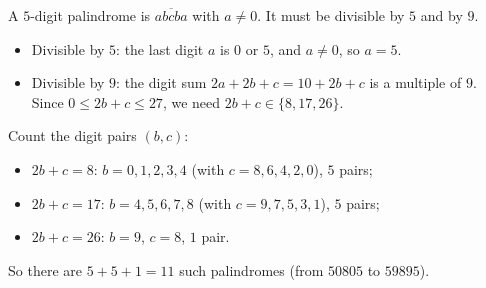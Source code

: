 A $5$-digit palindrome is $\overline{abcba}$ with $a\ne0$. It must be divisible by $5$ and by $9$.
\begin{itemize}
\item Divisible by $5$: the last digit $a$ is $0$ or $5$, and $a\ne0$, so $a=5$.
\item Divisible by $9$: the digit sum $2a+2b+c=10+2b+c$ is a multiple of $9$. Since $0\le2b+c\le27$, we need $2b+c\in\{8,17,26\}$.
\end{itemize}
Count the digit pairs $(b,c)$:
\begin{itemize}
\item $2b+c=8$: $b=0,1,2,3,4$ (with $c=8,6,4,2,0$), $5$ pairs;
\item $2b+c=17$: $b=4,5,6,7,8$ (with $c=9,7,5,3,1$), $5$ pairs;
\item $2b+c=26$: $b=9$, $c=8$, $1$ pair.
\end{itemize}
So there are $5+5+1=\boxed{11}$ such palindromes (from $50805$ to $59895$).
